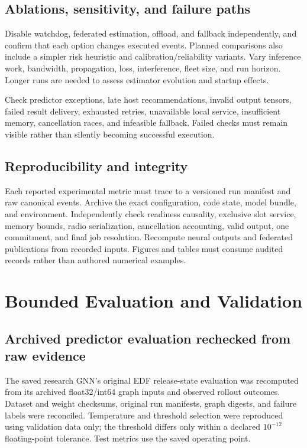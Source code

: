 \documentclass[11pt,a4paper]{article}
\begin{document}
\subsection{Ablations, sensitivity, and failure paths}
Disable watchdog, federated estimation, offload, and fallback independently, and
confirm that each option changes executed events. Planned comparisons also
include a simpler risk heuristic and calibration/reliability variants. Vary
inference work, bandwidth, propagation, loss, interference, fleet size, and run
horizon. Longer runs are needed to assess estimator evolution and startup effects.

Check predictor exceptions, late host recommendations, invalid output tensors,
failed result delivery, exhausted retries, unavailable local service, insufficient
memory, cancellation races, and infeasible fallback. Failed checks must remain
visible rather than silently becoming successful execution.

\subsection{Reproducibility and integrity}
Each reported experimental metric must trace to a versioned run manifest and
raw canonical events. Archive the exact configuration, code state, model bundle,
and environment. Independently check readiness causality, exclusive slot service,
memory bounds, radio serialization, cancellation accounting, valid output, one
commitment, and final job resolution. Recompute neural outputs and federated
publications from recorded inputs. Figures and tables must consume audited
records rather than authored numerical examples.

\section{Bounded Evaluation and Validation}
\subsection{Archived predictor evaluation rechecked from raw evidence}
The saved research GNN's original EDF release-state evaluation was recomputed
from its archived float32/int64 graph inputs and observed rollout outcomes.
Dataset and weight checksums, original run manifests, graph digests, and failure
labels were reconciled. Temperature and threshold selection were reproduced
using validation data only; the threshold differs only within a declared
$10^{-12}$ floating-point tolerance. Test metrics use the saved operating point.
\end{document}
